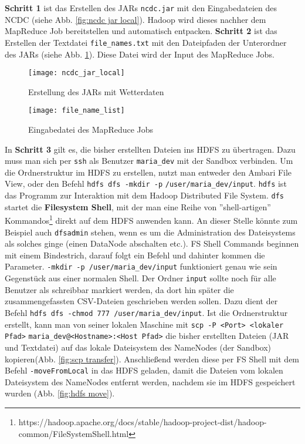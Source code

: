 \textbf{Schritt 1} ist das Erstellen des JARs \verb|ncdc.jar| mit den Eingabedateien des NCDC (siehe Abb. \ref{fig:ncdc jar local}). Hadoop wird dieses nachher dem MapReduce Job bereitstellen und automatisch entpacken. \textbf{Schritt 2} ist das Erstellen der Textdatei \verb|file_names.txt| mit den Dateipfaden der Unterordner des JARs (siehe Abb. \ref{fig:file names txt local}). Diese Datei wird der Input des MapReduce Jobs. 

\begin{figure}[ht]
    \centering
    \texttt{[image: ncdc\_jar\_local]}
    \caption[Erstellung des JARs mit Wetterdaten]{Erstellung des JARs mit Wetterdaten}
    \label{fig:ncdc jar local}
    \texttt{[image: file\_name\_list]}
    \caption[Eingabedatei des MapReduce Jobs]{Eingabedatei des MapReduce Jobs}
    \label{fig:file names txt local}
\end{figure}

In \textbf{Schritt 3} gilt es, die bisher erstellten Dateien ins HDFS zu übertragen. Dazu muss man sich per \verb|ssh| als Benutzer \verb|maria_dev| mit der Sandbox verbinden. Um die Ordnerstruktur im HDFS zu erstellen, nutzt man entweder den Ambari File View, oder den Befehl \verb|hdfs dfs -mkdir -p| \verb|/user/maria_dev/input|. \verb|hdfs| ist das Programm zur Interaktion mit dem Hadoop Distributed File System. \verb|dfs| startet die \textbf{Filesystem Shell}, mit der man eine Reihe von ''shell-artigen'' Kommandos\footnote{https://hadoop.apache.org/docs/stable/hadoop-project-dist/hadoop-common/FileSystemShell.html} direkt auf dem HDFS anwenden kann. An dieser Stelle könnte zum Beispiel auch \verb|dfsadmin| stehen, wenn es um die Administration des Dateisystems als solches ginge (einen DataNode abschalten etc.). FS Shell Commands beginnen mit einem Bindestrich, darauf folgt ein Befehl und dahinter kommen die Parameter. \verb|-mkdir -p /user/maria_dev/input| funktioniert genau wie sein Gegenstück aus einer normalen Shell. Der Ordner \verb|input| sollte noch für alle Benutzer als schreibbar markiert werden, da dort hin später die zusammengefassten CSV-Dateien geschrieben werden sollen. Dazu dient der Befehl \verb|hdfs dfs -chmod 777 /user/maria_dev/input|. Ist die Ordnerstruktur erstellt, kann man von seiner lokalen Maschine mit \verb|scp -P <Port> <lokaler Pfad>| \verb|maria_dev@<Hostname>:<Host Pfad>| die bisher erstellten Dateien (JAR und Textdatei) auf das lokale Dateisystem des NameNodes (der Sandbox) kopieren(Abb. \ref{fig:scp transfer}). Anschließend werden diese per FS Shell mit dem Befehl \verb|-moveFromLocal| in das HDFS geladen, damit die Dateien vom lokalen Dateisystem des NameNodes entfernt werden, nachdem sie im HDFS gespeichert wurden (Abb. \ref{fig:hdfs move}).


